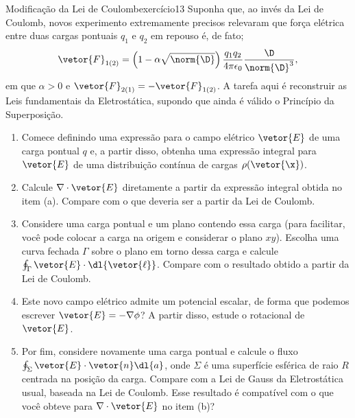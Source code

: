 \begin{exercício}{Modificação da Lei de Coulomb}{exercício13}
    Suponha que, ao invés da Lei de Coulomb, novos experimento extremamente precisos relevaram que força elétrica entre duas cargas pontuais \(q_1\) e \(q_2\) em repouso é, de fato;
    \begin{equation*}
        \vetor{F}_{1(2)} = \left(1 - \alpha\sqrt{\norm{\D}}\right)\frac{q_1q_2}{4\pi \epsilon_0} \frac{\D}{\norm{\D}^3},
    \end{equation*}
    em que \(\alpha > 0\) e \(\vetor{F}_{2(1)} = -\vetor{F}_{1(2)}\). A tarefa aqui é reconstruir as Leis fundamentais da Eletrostática, supondo que ainda é válido o Princípio da Superposição.
    \begin{enumerate}[label=(\alph*)]
        \item Comece definindo uma expressão para o campo elétrico \(\vetor{E}\) de uma carga pontual \(q\) e, a partir disso, obtenha uma expressão integral para \(\vetor{E}\) de uma distribuição contínua de cargas \(\rho(\vetor{\x})\).
        \item Calcule \(\nabla \cdot \vetor{E}\) diretamente a partir da expressão integral obtida no item (a). Compare com o que deveria ser a partir da Lei de Coulomb.
        \item Considere uma carga pontual e um plano contendo essa carga (para facilitar, você pode colocar a carga na origem e considerar o plano \(xy\)). Escolha uma curva fechada \(\Gamma\) sobre o plano em torno dessa carga e calcule \(\oint_\Gamma \vetor{E}\cdot \dl{\vetor{\ell}}\). Compare com o resultado obtido a partir da Lei de Coulomb.
        \item Este novo campo elétrico admite um potencial escalar, de forma que podemos escrever \(\vetor{E} = - \nabla\phi\)? A partir disso, estude o rotacional de \(\vetor{E}\).
        \item Por fim, considere novamente uma carga pontual e calcule o fluxo \(\oint_\Sigma \vetor{E}\cdot \vetor{n}\dl{a}\), onde \(\Sigma\) é uma superfície esférica de raio \(R\) centrada na posição da carga. Compare com a Lei de Gauss da Eletrostática usual, baseada na Lei de Coulomb. Esse resultado é compatível com o que você obteve para \(\nabla\cdot \vetor{E}\) no item (b)?
    \end{enumerate}
\end{exercício}
